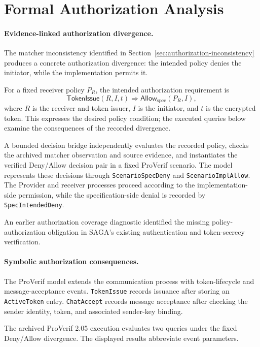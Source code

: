 \section{Formal Authorization Analysis}
\label{sec:formalization}

\paragraph{Evidence-linked authorization divergence.}
The matcher inconsistency identified in
Section~\ref{sec:authorization-inconsistency}
produces a concrete authorization divergence:
the intended policy denies the initiator, while
the implementation permits it.

For a fixed receiver policy $P_R$, the intended
authorization requirement is
\[
 \mathsf{TokenIssue}(R,I,t)
 \Longrightarrow
 \mathsf{Allow}_{\mathrm{spec}}(P_R,I),
\]
where $R$ is the receiver and token issuer,
$I$ is the initiator, and $t$ is the encrypted
token. This expresses the desired policy
condition; the executed queries below examine
the consequences of the recorded divergence.

A bounded decision bridge independently evaluates
the recorded policy, checks the archived matcher
observation and source evidence, and instantiates
the verified Deny/Allow decision pair in a fixed
ProVerif scenario. The model represents these
decisions through \texttt{ScenarioSpecDeny}
and \texttt{ScenarioImplAllow}. The Provider and
receiver processes proceed according to the
implementation-side permission, while the
specification-side denial is recorded by
\texttt{SpecIntendedDeny}.

An earlier authorization coverage diagnostic
identified the missing policy-authorization
obligation in SAGA's existing authentication
and token-secrecy verification.

\paragraph{Symbolic authorization consequences.}
The ProVerif model extends the communication
process with token-lifecycle and message-acceptance
events. \texttt{TokenIssue} records issuance
after storing an \texttt{ActiveToken} entry.
\texttt{ChatAccept} records message acceptance
after checking the sender identity, token,
and associated sender-key binding.

The archived ProVerif 2.05 execution evaluates
two queries under the fixed Deny/Allow divergence.
The displayed results abbreviate event parameters.


